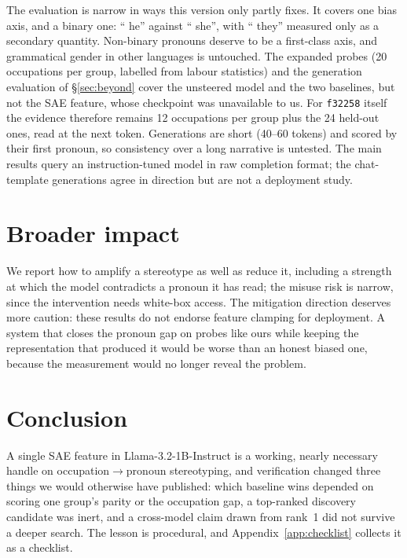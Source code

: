 \documentclass{article}
\newcommand{\ff}[1]{\texttt{f#1}}
\begin{document}
The evaluation is narrow in ways this version only partly fixes. It covers one bias axis,
and a binary one: `` he'' against `` she'', with `` they'' measured only as a secondary
quantity. Non-binary pronouns deserve to be a first-class axis, and grammatical gender in
other languages is untouched. The expanded probes (20 occupations per group, labelled from
labour statistics) and the generation evaluation of \S\ref{sec:beyond} cover the unsteered
model and the two baselines, but not the SAE feature, whose checkpoint was unavailable to
us. For \ff{32258} itself the evidence therefore remains 12
occupations per group plus the 24 held-out ones, read at the next token. Generations are
short (40--60 tokens) and scored by their first pronoun, so consistency over a long
narrative is untested. The main results query an instruction-tuned model in raw completion
format; the chat-template generations agree in direction but are not a deployment study.

\section{Broader impact}

We report how to amplify a stereotype as well as reduce it, including a strength at which the
model contradicts a pronoun it has read; the misuse risk is narrow, since the intervention
needs white-box access. The mitigation direction deserves more caution: these results do not
endorse feature clamping for deployment. A system that closes the pronoun gap on probes like
ours while keeping the representation that produced it would be worse than an honest biased
one, because the measurement would no longer reveal the problem.

\section{Conclusion}

A single SAE feature in Llama-3.2-1B-Instruct is a working, nearly necessary handle on
occupation$\rightarrow$pronoun stereotyping, and verification changed three things we
would otherwise have published: which baseline wins depended on scoring one group's parity
or the occupation gap, a top-ranked discovery candidate was inert, and a cross-model claim
drawn from rank~1 did not survive a deeper search. The lesson is procedural, and
Appendix~\ref{app:checklist} collects it as a checklist.

{\small


}
\end{document}
